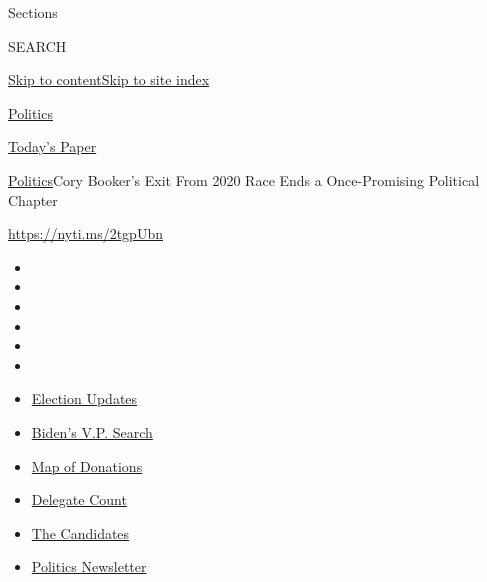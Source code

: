 Sections

SEARCH

\protect\hyperlink{site-content}{Skip to
content}\protect\hyperlink{site-index}{Skip to site index}

\href{https://www.nytimes.com/section/politics}{Politics}

\href{https://myaccount.nytimes.com/auth/login?response_type=cookie\&client_id=vi}{}

\href{https://www.nytimes.com/section/todayspaper}{Today's Paper}

\href{/section/politics}{Politics}\textbar{}Cory Booker's Exit From 2020
Race Ends a Once-Promising Political Chapter

\url{https://nyti.ms/2tgpUbn}

\begin{itemize}
\item
\item
\item
\item
\item
\item
\end{itemize}

\begin{itemize}
\item
  \href{https://www.nytimes.com/2020/07/31/us/elections/biden-vs-trump.html?action=click\&pgtype=Article\&state=default\&region=TOP_BANNER\&context=storylines_menu}{Election
  Updates}
\item
  \href{https://www.nytimes.com/article/biden-vice-president-2020.html?action=click\&pgtype=Article\&state=default\&region=TOP_BANNER\&context=storylines_menu}{Biden's
  V.P. Search}
\item
  \href{https://www.nytimes.com/interactive/2020/07/24/us/politics/trump-biden-campaign-donors.html?action=click\&pgtype=Article\&state=default\&region=TOP_BANNER\&context=storylines_menu}{Map
  of Donations}
\item
  \href{https://www.nytimes.com/interactive/2020/us/elections/delegate-count-primary-results.html?action=click\&pgtype=Article\&state=default\&region=TOP_BANNER\&context=storylines_menu}{Delegate
  Count}
\item
  \href{https://www.nytimes.com/interactive/2019/us/politics/2020-presidential-candidates.html?action=click\&pgtype=Article\&state=default\&region=TOP_BANNER\&context=storylines_menu}{The
  Candidates}
\item
  \href{https://www.nytimes.com/newsletters/politics?action=click\&pgtype=Article\&state=default\&region=TOP_BANNER\&context=storylines_menu}{Politics
  Newsletter}
\end{itemize}


